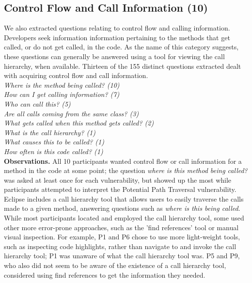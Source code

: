 \documentclass[conference]{IEEEtran}
\begin{document}

\noindent\subsection{\textbf{Control Flow and Call Information (10)}}\label{cf}

We also extracted questions relating to control flow and calling information. 
Developers seek information information pertaining to the methods that get called, or do not get called, in the code. 
As the name of this category suggests, these questions can generally be answered using a tool for viewing the call hierarchy, when available. 
Thirteen of the 155 distinct questions extracted dealt with acquiring control flow and call information.
\\


\noindent\emph{Where is the method being called? (10)} \\
\emph{How can I get calling information? (7)} \\
\emph{Who can call this? (5)} \\
\emph{Are all calls coming from the same class? (3)} \\
\emph{What gets called when this method gets called? (2)} \\
\emph{What is the call hierarchy? (1)} \\
\emph{What causes this to be called? (1)} \\
\emph{How often is this code called? (1)} \\


\noindent\textbf{Observations.}
All 10 participants wanted control flow or call information for a method in the code at some point; the question \textit{where is this method being called?} was asked at least once for each vulnerability, but showed up the most while participants attempted to interpret the Potential Path Traversal vulnerability.
Eclipse includes a call hierarchy tool that allows users to easily traverse the calls made to a given method, answering questions such as \textit{where is this being called}. 
While most participants located and employed the call hierarchy tool, some used other more error-prone approaches, such as the 'find references' tool or manual visual inspection. 
For example, P1 and P6 chose to use more light-weight tools, such as inspecting code highlights, rather than navigate to and invoke the call hierarchy tool; P1 was unaware of what the call hierarchy tool was. 
P5 and P9, who also did not seem to be aware of the existence of a call hierarchy tool, considered using find references to get the information they needed.
\end{document}

